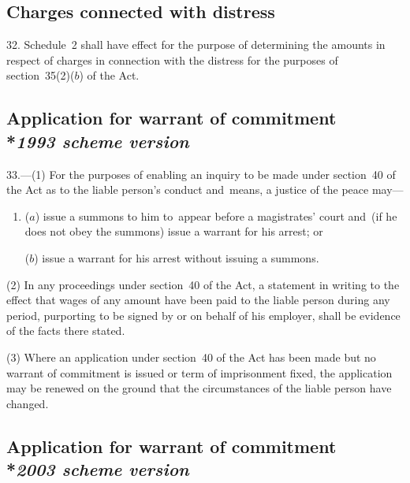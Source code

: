 \documentclass[12pt,a4paper]{article}
\begin{document}
\subsection[32. Charges connected with distress]{Charges connected with distress}

32.  Schedule~2 shall have effect for the purpose of determining the amounts in respect of charges in connection with the distress for the purposes of section~35(2)($b$) of the Act.

\subsection[33. Application for warrant of commitment --- \emph{1993 scheme version}]{Application for warrant of commitment\\*\emph{1993 scheme version}}

33.—(1) For the purposes of enabling an inquiry to be made under section~40 of the Act as to the liable person’s conduct and~means, a justice of the peace 
may—
\begin{enumerate}\item[]
($a$) issue a summons to him to~appear before a magistrates' court and~(if he does not obey the summons) issue a warrant for his arrest; or

($b$) issue a warrant for his arrest without issuing a summons.
\end{enumerate}

(2) In any proceedings under section~40 of the Act, a statement in writing to the effect that wages of any amount have been paid to the liable person during any period, purporting to be signed by or on behalf of his employer, shall be evidence of the facts there stated.

(3) Where an application under section~40 of the Act has been made but no warrant of commitment is issued or term of imprisonment fixed, the application may be renewed on the ground that the circumstances of the liable person have changed.


\subsection[33. Application for warrant of commitment --- \emph{2003 scheme version}]{Application for warrant of commitment\\*\emph{2003 scheme version}}
\end{document}
